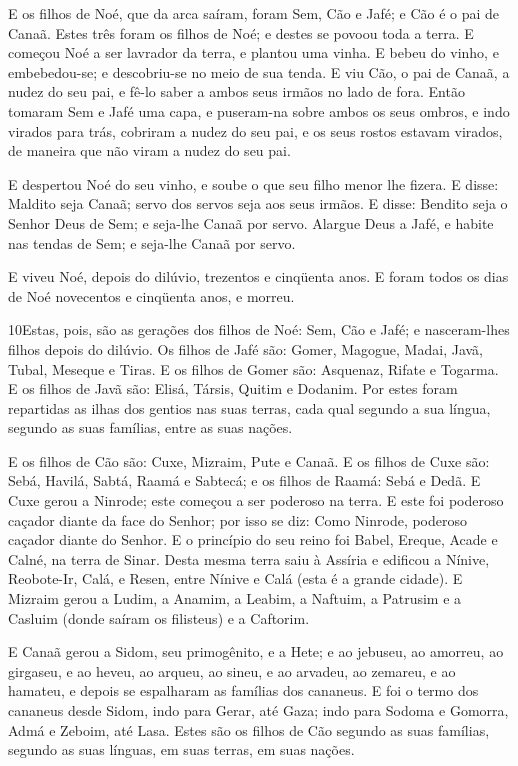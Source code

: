 E os filhos de Noé, que da arca saíram, foram Sem, Cão e Jafé; e
Cão é o pai de Canaã. Estes três foram os filhos de Noé; e
destes se povoou toda a terra. E começou Noé a ser lavrador
da terra, e plantou uma vinha. E bebeu do vinho, e
embebedou-se; e descobriu-se no meio de sua tenda. E viu Cão,
o pai de Canaã, a nudez do seu pai, e fê-lo saber a ambos seus
irmãos no lado de fora. Então tomaram Sem e Jafé uma capa, e
puseram-na sobre ambos os seus ombros, e indo virados para trás,
cobriram a nudez do seu pai, e os seus rostos estavam virados, de
maneira que não viram a nudez do seu pai.

E despertou Noé do seu vinho, e soube o que seu filho menor lhe
fizera. E disse: Maldito seja Canaã; servo dos servos seja
aos seus irmãos. E disse: Bendito seja o Senhor Deus de Sem;
e seja-lhe Canaã por servo. Alargue Deus a Jafé, e habite nas
tendas de Sem; e seja-lhe Canaã por servo.

E viveu Noé, depois do dilúvio, trezentos e cinqüenta anos.
E foram todos os dias de Noé novecentos e cinqüenta anos, e
morreu.

\smallskip

\lettrine{10} Estas, pois, são as gerações dos filhos de Noé:
Sem, Cão e Jafé; e nasceram-lhes filhos depois do dilúvio. Os
filhos de Jafé são: Gomer, Magogue, Madai, Javã, Tubal, Meseque e
Tiras. E os filhos de Gomer são: Asquenaz, Rifate e Togarma.
E os filhos de Javã são: Elisá, Társis, Quitim e Dodanim.
Por estes foram repartidas as ilhas dos gentios nas suas terras,
cada qual segundo a sua língua, segundo as suas famílias, entre as
suas nações.

E os filhos de Cão são: Cuxe, Mizraim, Pute e Canaã. E os
filhos de Cuxe são: Sebá, Havilá, Sabtá, Raamá e Sabtecá; e os
filhos de Raamá: Sebá e Dedã. E Cuxe gerou a Ninrode; este
começou a ser poderoso na terra. E este foi poderoso caçador
diante da face do Senhor; por isso se diz: Como Ninrode, poderoso
caçador diante do Senhor. E o princípio do seu reino foi
Babel, Ereque, Acade e Calné, na terra de Sinar. Desta mesma
terra saiu à Assíria e edificou a Nínive, Reobote-Ir, Calá, e
Resen, entre Nínive e Calá (esta é a grande cidade). E
Mizraim gerou a Ludim, a Anamim, a Leabim, a Naftuim, a
Patrusim e a Casluim (donde saíram os filisteus) e a Caftorim.

E Canaã gerou a Sidom, seu primogênito, e a Hete; e ao
jebuseu, ao amorreu, ao girgaseu, e ao heveu, ao arqueu, ao
sineu, e ao arvadeu, ao zemareu, e ao hamateu, e depois se
espalharam as famílias dos cananeus. E foi o termo dos
cananeus desde Sidom, indo para Gerar, até Gaza; indo para Sodoma e
Gomorra, Admá e Zeboim, até Lasa. Estes são os filhos de Cão
segundo as suas famílias, segundo as suas línguas, em suas terras,
em suas nações.

